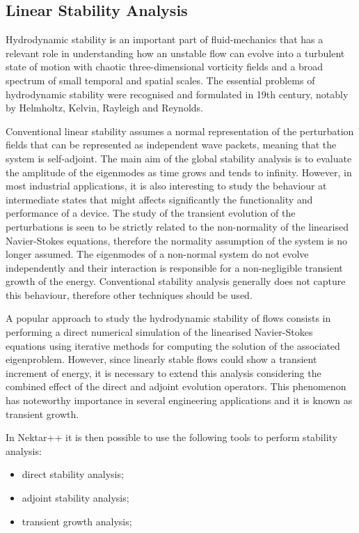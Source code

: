 \subsection{Linear Stability Analysis}

Hydrodynamic stability is an important part of fluid-mechanics that has a relevant role in understanding how an unstable flow can evolve into a turbulent state of motion with chaotic three-dimensional vorticity fields and a broad spectrum of small temporal and spatial scales. The essential problems of hydrodynamic stability were recognised and formulated in 19th century, notably by Helmholtz, Kelvin, Rayleigh and Reynolds.

Conventional linear stability assumes a normal representation of the perturbation fields that can be represented as independent wave packets, meaning that the system is self-adjoint. The main aim of the global stability analysis is to evaluate the amplitude of the eigenmodes as time grows and tends to infinity. However, in most industrial applications, it is also interesting to study the behaviour at intermediate states that might affects significantly the functionality and performance of a device. The study of the transient evolution of the perturbations is seen to be strictly related to the non-normality of the linearised Navier-Stokes equations, therefore the normality assumption of the system is no longer assumed. The eigenmodes of a non-normal system do not evolve independently and their interaction is responsible for a non-negligible transient growth of the energy. Conventional stability analysis generally does not capture this behaviour, therefore other techniques should be used.

A popular approach to study the hydrodynamic stability of flows consists in performing a direct numerical simulation of the linearised Navier-Stokes equations using iterative methods for computing the solution of the associated eigenproblem. However, since linearly stable flows could show a transient increment of energy, it is necessary to extend this analysis considering the combined effect of the direct and adjoint evolution operators. This phenomenon has noteworthy importance in several engineering applications and it is known as transient growth.

In Nektar++ it is then possible to use the following tools to perform stability analysis:

\begin{itemize}
\item direct stability analysis;
\item adjoint stability analysis;
\item  transient growth analysis;
\end{itemize}

